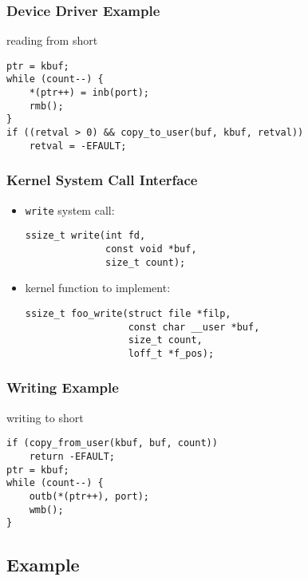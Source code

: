 \documentclass[dvipsnames]{beamer}
\begin{document}
\begin{frame}[fragile]
  \frametitle{Device Driver Example}

  \begin{exampleblock}{reading from short}
    \begin{lstlisting}
ptr = kbuf;
while (count--) {
    *(ptr++) = inb(port);
    rmb();
}
if ((retval > 0) && copy_to_user(buf, kbuf, retval))
    retval = -EFAULT;
    \end{lstlisting}
  \end{exampleblock}
\end{frame}

\begin{frame}[fragile]
  \frametitle{Kernel System Call Interface}

  \begin{itemize}
    \item \lstinline|write| system call:
    \begin{lstlisting}
ssize_t write(int fd,
              const void *buf,
              size_t count);
    \end{lstlisting}

    \medskip
    \item kernel function to implement:
    \begin{lstlisting}
ssize_t foo_write(struct file *filp,
                  const char __user *buf,
                  size_t count,
                  loff_t *f_pos);
    \end{lstlisting}
  \end{itemize}
\end{frame}

\begin{frame}[fragile]
  \frametitle{Writing Example}

  \begin{exampleblock}{writing to short}
    \begin{lstlisting}
if (copy_from_user(kbuf, buf, count))
    return -EFAULT;
ptr = kbuf;
while (count--) {
    outb(*(ptr++), port);
    wmb();
}
    \end{lstlisting}
  \end{exampleblock}
\end{frame}

\subsection{Example}
\end{document}

